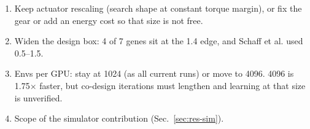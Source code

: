 \documentclass[sigconf,review]{acmart}
\begin{document}
\begin{itemize}
\begin{enumerate}
  \item Keep actuator rescaling (search shape at constant torque margin), or fix the gear or add an energy cost so that size is not free.
  \item Widen the design box: 4 of 7 genes sit at the 1.4 edge, and Schaff et al. used 0.5--1.5.
  \item Envs per GPU: stay at 1024 (as all current runs) or move to 4096. 4096 is 1.75$\times$ faster, but co-design iterations must lengthen and learning at that size is unverified.
  \item Scope of the simulator contribution (Sec.~\ref{sec:res-sim}).
  \end{enumerate}
\end{itemize}

\end{document}
